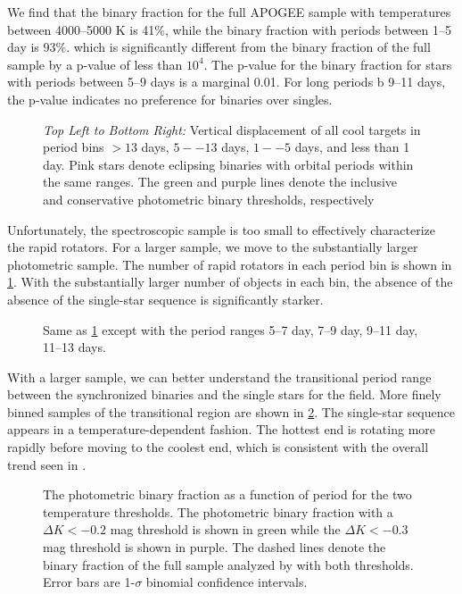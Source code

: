 \documentclass[manuscript]{aastex6}
\begin{document}
We find that the binary fraction for the full APOGEE sample with temperatures
between 4000--5000 K is 41\%,  while the binary fraction with periods 
between 1--5 day is 93\%. which
is significantly different from the binary fraction of the full sample by a
p-value of less than \(10^4\). The p-value for the binary fraction for stars
with periods between 5--9 days is a marginal 0.01. For long periods b
9--11 days, the p-value indicates no preference for binaries over singles.

\begin{figure}[htb]
    \centering
    \caption{\emph{Top Left to Bottom Right:} Vertical displacement of all 
        cool \citet{McQuillan14} targets in period bins \(> 13\) days, 
        \(5--13\) days, \(1--5\) days, and less than 1 day. Pink stars denote 
        eclipsing binaries with orbital periods within the same ranges. The 
        green and purple lines denote the inclusive and conservative 
        photometric binary thresholds, 
    respectively}\label{fig:mcq_rapid_excess}
\end{figure}

Unfortunately, the spectroscopic sample is too small to effectively
characterize the rapid rotators. For a larger sample, we move to the 
substantially larger photometric sample. The number of rapid rotators in each 
period bin is shown in \cref{fig:mcq_rapid_excess}. With the substantially 
larger number of objects in each bin, the absence of the absence of the
single-star sequence is significantly starker.

\begin{figure}[htb]
    \centering
    \caption{Same as \cref{fig:mcq_rapid_excess} except with the period ranges
    5--7 day, 7--9 day, 9--11 day, 11--13 days.}
    \label{fig:mcquillan_transition}
\end{figure}

With a larger sample, we can better understand the transitional period range
between the synchronized binaries and the single stars for the field. More
finely binned samples of the transitional region are shown in
\cref{fig:mcquillan_transition}. The single-star sequence appears in a
temperature-dependent fashion. The hottest end is rotating more rapidly before
moving to the coolest end, which is consistent with the overall trend seen in 
\citet{McQuillan14}.

\begin{figure}[htb]
    \centering
    \caption{The photometric binary fraction as a function of period for the
        two temperature thresholds. The photometric binary fraction with a
        \(\Delta K < -0.2\) mag threshold is shown in green while the \(\Delta
        K < -0.3\) mag threshold is shown in purple. The dashed lines denote
        the binary fraction of the full sample analyzed by \citet{McQuillan14}
        with both thresholds. Error bars are 1-\(\sigma\) binomial confidence 
    intervals.}\label{fig:binary_fraction}
\end{figure}
\end{document}
